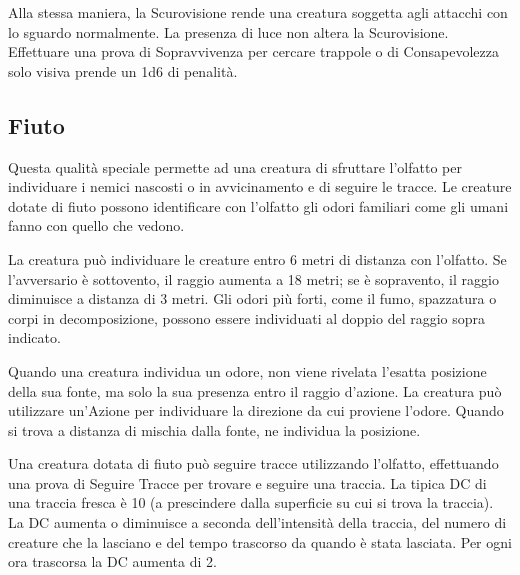 \begin{multicols}{2}
Alla stessa maniera, la Scurovisione rende una creatura soggetta agli attacchi con lo sguardo normalmente. La presenza di luce non altera la Scurovisione.
Effettuare una prova di Sopravvivenza per cercare trappole o di Consapevolezza solo visiva prende un 1d6 di penalità.

\subsection{Fiuto}\label{fiuto}

Questa qualità speciale permette ad una creatura di sfruttare l'olfatto per individuare i nemici nascosti o in avvicinamento e di seguire le tracce. Le creature dotate di fiuto possono identificare con l'olfatto gli odori familiari come gli umani fanno con quello che vedono.

La creatura può individuare le creature entro 6 metri di distanza con l'olfatto. Se l'avversario è sottovento, il raggio aumenta a 18 metri; se è sopravento, il raggio diminuisce a distanza di 3 metri.
Gli odori più forti, come il fumo, spazzatura o corpi in decomposizione, possono essere individuati al doppio del raggio sopra indicato.


Quando una creatura individua un odore, non viene rivelata l'esatta posizione della sua fonte, ma solo la sua presenza entro il raggio d'azione. La creatura può utilizzare un'Azione per individuare la direzione da cui proviene l'odore. Quando si trova a distanza di mischia dalla fonte, ne individua la posizione.

Una creatura dotata di fiuto può seguire tracce utilizzando l'olfatto, effettuando una prova di Seguire Tracce per trovare e seguire una traccia. La tipica DC di una traccia fresca è 10 (a prescindere dalla superficie su cui si trova la traccia). La DC aumenta o diminuisce a seconda dell'intensità della traccia, del numero di creature che la lasciano e del tempo trascorso da quando è stata lasciata. Per ogni ora trascorsa la DC aumenta di 2.



\end{multicols}
